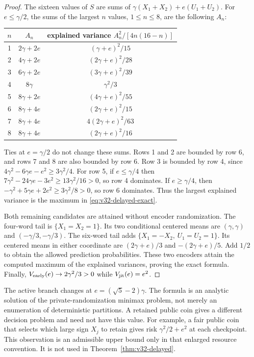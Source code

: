 \begin{proof}
The sixteen values of $S$ are sums of
$\gamma(X_1+X_2)+e(U_1+U_2)$. For $e\le \gamma/2$, the sums of the
largest $n$ values, $1\le n\le8$, are the following $A_n$:
\begin{center}
\begin{tabular}{c c c}
\toprule
$n$ & $A_n$ & explained variance $A_n^2/[4n(16-n)]$\\
\midrule
1 & $2\gamma+2e$ & $(\gamma+e)^2/15$\\
2 & $4\gamma+2e$ & $(2\gamma+e)^2/28$\\
3 & $6\gamma+2e$ & $(3\gamma+e)^2/39$\\
4 & $8\gamma$ & $\gamma^2/3$\\
5 & $8\gamma+2e$ & $(4\gamma+e)^2/55$\\
6 & $8\gamma+4e$ & $(2\gamma+e)^2/15$\\
7 & $8\gamma+4e$ & $4(2\gamma+e)^2/63$\\
8 & $8\gamma+4e$ & $(2\gamma+e)^2/16$\\
\bottomrule
\end{tabular}
\end{center}
Ties at $e=\gamma/2$ do not change these sums. Rows 1 and 2 are bounded
by row 6, and rows 7 and 8 are also bounded by row 6. Row 3 is bounded
by row 4, since
$4\gamma^2-6\gamma e-e^2\ge3\gamma^2/4$.
For row 5, if $e\le \gamma/4$ then
$7\gamma^2-24\gamma e-3e^2\ge13\gamma^2/16>0$, so row 4 dominates.
If $e\ge \gamma/4$, then
$-\gamma^2+5\gamma e+2e^2\ge3\gamma^2/8>0$, so row 6 dominates.
Thus the largest explained variance is the maximum in
\eqref{eq:v32-delayed-exact}.

Both remaining candidates are attained without encoder randomization.
The four-word tail is $\{X_1=X_2=1\}$. Its two conditional centered
means are $(\gamma,\gamma)$ and $(-\gamma/3,-\gamma/3)$.
The six-word tail adds
$\{X_1=-X_2,\ U_1=U_2=1\}$. Its centered means in either coordinate
are $(2\gamma+e)/3$ and $-(2\gamma+e)/5$. Add $1/2$ to obtain the allowed
prediction probabilities. These two encoders attain the computed maximum
of the explained variances, proving the exact formula. Finally,
$V_{\rm early}(e)\to2\gamma^2/3>0$ while $V_{\rm jit}(e)=e^2$.
\end{proof}

The active branch changes at $e=(\sqrt5-2)\gamma$. The formula is an
analytic solution of the private-randomization minimax problem, not merely
an enumeration of deterministic partitions. A retained public coin gives
a different decision problem and need not have this value. For example,
a fair public coin that selects which large sign $X_j$ to retain gives
risk $\gamma^2/2+e^2$ at each checkpoint. This observation is an admissible
upper bound only in that enlarged resource convention. It is not used in
Theorem~\ref{thm:v32-delayed}.

